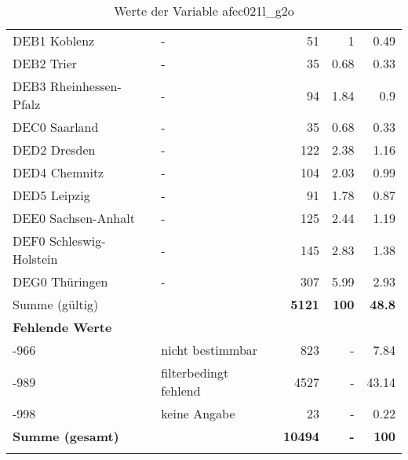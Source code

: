 \begin{longtable}{Xlrrr}
        \multicolumn{1}{X}{DEB1 Koblenz} & - & \num{51} & \num[round-mode=places,round-precision=2]{1} & \num[round-mode=places,round-precision=2]{0.49} \\
        \multicolumn{1}{X}{DEB2 Trier} & - & \num{35} & \num[round-mode=places,round-precision=2]{0.68} & \num[round-mode=places,round-precision=2]{0.33} \\
        \multicolumn{1}{X}{DEB3 Rheinhessen-Pfalz} & - & \num{94} & \num[round-mode=places,round-precision=2]{1.84} & \num[round-mode=places,round-precision=2]{0.9} \\
        \multicolumn{1}{X}{DEC0 Saarland} & - & \num{35} & \num[round-mode=places,round-precision=2]{0.68} & \num[round-mode=places,round-precision=2]{0.33} \\
        \multicolumn{1}{X}{DED2 Dresden} & - & \num{122} & \num[round-mode=places,round-precision=2]{2.38} & \num[round-mode=places,round-precision=2]{1.16} \\
        \multicolumn{1}{X}{DED4 Chemnitz} & - & \num{104} & \num[round-mode=places,round-precision=2]{2.03} & \num[round-mode=places,round-precision=2]{0.99} \\
        \multicolumn{1}{X}{DED5 Leipzig} & - & \num{91} & \num[round-mode=places,round-precision=2]{1.78} & \num[round-mode=places,round-precision=2]{0.87} \\
        \multicolumn{1}{X}{DEE0 Sachsen-Anhalt} & - & \num{125} & \num[round-mode=places,round-precision=2]{2.44} & \num[round-mode=places,round-precision=2]{1.19} \\
        \multicolumn{1}{X}{DEF0 Schleswig-Holstein} & - & \num{145} & \num[round-mode=places,round-precision=2]{2.83} & \num[round-mode=places,round-precision=2]{1.38} \\
        \multicolumn{1}{X}{DEG0 Thüringen} & - & \num{307} & \num[round-mode=places,round-precision=2]{5.99} & \num[round-mode=places,round-precision=2]{2.93} \\
     \midrule
      \multicolumn{2}{l}{Summe (gültig)} & \textbf{\num{5121}} &
      \textbf{\num{100}} &
         \textbf{\num[round-mode=places,round-precision=2]{48.8}} \\
     \multicolumn{5}{l}{\textbf{Fehlende Werte}}\\
       -966 & nicht bestimmbar & \num{823} & - & \num[round-mode=places,round-precision=2]{7.84} \\

       -989 & filterbedingt fehlend & \num{4527} & - & \num[round-mode=places,round-precision=2]{43.14} \\

       -998 & keine Angabe & \num{23} & - & \num[round-mode=places,round-precision=2]{0.22} \\

     \midrule
     \multicolumn{2}{l}{\textbf{Summe (gesamt)}} & \textbf{\num{10494}} & \textbf{-} & \textbf{\num{100}} \\
     \bottomrule
     \caption{Werte der Variable afec021l\_g2o}
     \end{longtable}
     
